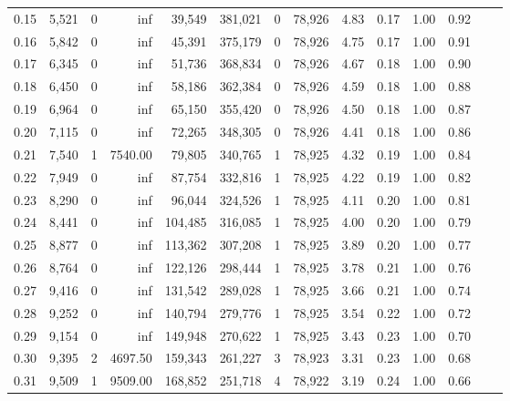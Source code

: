 \begin{tabular}{rrrrrrrrrrrrrr}
0.15 &  5,521 &      0 &      inf &   39,549 &  381,021 &       0 &  78,926 &  4.83 &  0.17 &  1.00 &      0.92 \\
0.16 &  5,842 &      0 &      inf &   45,391 &  375,179 &       0 &  78,926 &  4.75 &  0.17 &  1.00 &      0.91 \\
0.17 &  6,345 &      0 &      inf &   51,736 &  368,834 &       0 &  78,926 &  4.67 &  0.18 &  1.00 &      0.90 \\
0.18 &  6,450 &      0 &      inf &   58,186 &  362,384 &       0 &  78,926 &  4.59 &  0.18 &  1.00 &      0.88 \\
0.19 &  6,964 &      0 &      inf &   65,150 &  355,420 &       0 &  78,926 &  4.50 &  0.18 &  1.00 &      0.87 \\
0.20 &  7,115 &      0 &      inf &   72,265 &  348,305 &       0 &  78,926 &  4.41 &  0.18 &  1.00 &      0.86 \\
0.21 &  7,540 &      1 &  7540.00 &   79,805 &  340,765 &       1 &  78,925 &  4.32 &  0.19 &  1.00 &      0.84 \\
0.22 &  7,949 &      0 &      inf &   87,754 &  332,816 &       1 &  78,925 &  4.22 &  0.19 &  1.00 &      0.82 \\
0.23 &  8,290 &      0 &      inf &   96,044 &  324,526 &       1 &  78,925 &  4.11 &  0.20 &  1.00 &      0.81 \\
0.24 &  8,441 &      0 &      inf &  104,485 &  316,085 &       1 &  78,925 &  4.00 &  0.20 &  1.00 &      0.79 \\
0.25 &  8,877 &      0 &      inf &  113,362 &  307,208 &       1 &  78,925 &  3.89 &  0.20 &  1.00 &      0.77 \\
0.26 &  8,764 &      0 &      inf &  122,126 &  298,444 &       1 &  78,925 &  3.78 &  0.21 &  1.00 &      0.76 \\
0.27 &  9,416 &      0 &      inf &  131,542 &  289,028 &       1 &  78,925 &  3.66 &  0.21 &  1.00 &      0.74 \\
0.28 &  9,252 &      0 &      inf &  140,794 &  279,776 &       1 &  78,925 &  3.54 &  0.22 &  1.00 &      0.72 \\
0.29 &  9,154 &      0 &      inf &  149,948 &  270,622 &       1 &  78,925 &  3.43 &  0.23 &  1.00 &      0.70 \\
0.30 &  9,395 &      2 &  4697.50 &  159,343 &  261,227 &       3 &  78,923 &  3.31 &  0.23 &  1.00 &      0.68 \\
0.31 &  9,509 &      1 &  9509.00 &  168,852 &  251,718 &       4 &  78,922 &  3.19 &  0.24 &  1.00 &      0.66 \\

\end{tabular}
